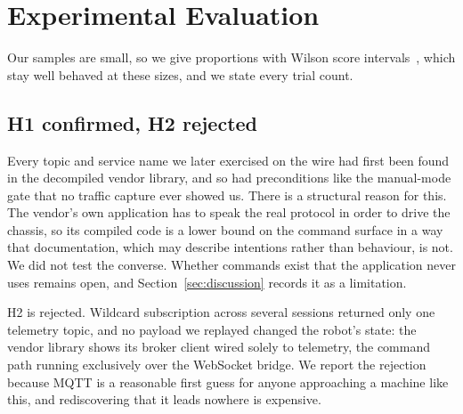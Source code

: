 %

\section{Experimental Evaluation}
\label{sec:eval}

Our samples are small, so we give proportions with Wilson score
intervals~\cite{wilson1927,brown2001interval}, which stay well behaved at these sizes, and we
state every trial count.

\subsection{H1 confirmed, H2 rejected}

Every topic and service name we later exercised on the wire had first been found in the
decompiled vendor library, and so had preconditions like the manual-mode gate that no traffic
capture ever showed us. There is a structural reason for this. The vendor's own application has
to speak the real protocol in order to drive the chassis, so its compiled code is a lower bound
on the command surface in a way that documentation, which may describe intentions rather than
behaviour, is not. We did not test the converse. Whether commands exist that the application
never uses remains open, and Section~\ref{sec:discussion} records it as a limitation.

H2 is rejected. Wildcard subscription across several sessions returned only one telemetry topic,
and no payload we replayed changed the robot's state: the vendor library shows its broker client
wired solely to telemetry, the command path running exclusively over the WebSocket bridge. We
report the rejection because MQTT is a reasonable first guess for anyone approaching a machine
like this, and rediscovering that it leads nowhere is expensive.

